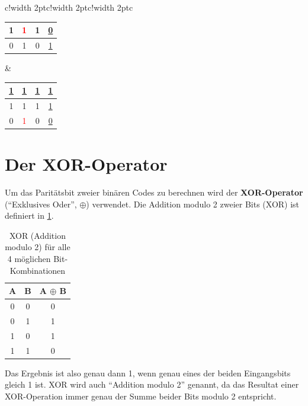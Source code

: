 \begin{myexercise}
\begin{myanswer}
\begin{table}[H]
\begin{tabular}{c!{\color{red}\vrule width 2pt}c!{\color{red}\vrule width 2pt}c!{\color{red}\vrule width 2pt}c}
\begin{tabular}{c|c|c||c}
                    1             & \textcolor{red}{1} & 1             & \underline{0} \\ \midrule
                    0             & 1                  & 0             & \underline{1} \\
                \end{tabular}                       &
                \begin{tabular}{c|c|c||c}
                    \underline{1} & \underline{1}      & \underline{1} & \underline{1} \\ \midrule\midrule
                    1             & 1                  & 1             & \underline{1} \\ \midrule
                    0             & \textcolor{red}{1} & 0             & \underline{0} \\
                \end{tabular}
            \end{tabular}
        \end{table}
    \end{myanswer}
\end{myexercise}

\section{Der XOR-Operator}

Um das Paritätsbit zweier binären Codes zu berechnen wird der \textbf{XOR-Operator} (\enquote{Exklusives Oder}, $\oplus$) verwendet. Die Addition modulo 2 zweier Bits (XOR) ist definiert in \cref{tab:mod2}.

\begin{table}[H]
    \centering
    \begin{tabular}{c|c||c}
        A & B & A $\oplus$ B \\\midrule\midrule
        0 & 0 & 0            \\\midrule
        0 & 1 & 1            \\\midrule
        1 & 0 & 1            \\\midrule
        1 & 1 & 0            \\
    \end{tabular}
    \caption{XOR (Addition modulo 2) für alle 4 möglichen Bit-Kombinationen}
    \label{tab:mod2}
\end{table}

Das Ergebnis ist also genau dann 1, wenn genau eines der beiden Eingangsbits gleich 1 ist. XOR wird auch \enquote{Addition modulo 2} genannt, da das Resultat einer XOR-Operation immer genau der Summe beider Bits modulo 2 entspricht.

